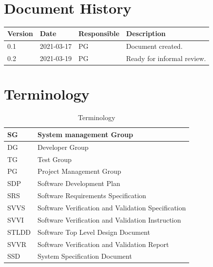 \documentclass{article}
\date {#1}
\title {
    \documentNumber {08}
    \documentVersion {0.2}
    \documentTitle {Project Final Report}
    \documentGroup {2}
    \documentResponsible {Project Management Group}
    \documentAuthors {Project Management Group}
    \documentDate {2021-03-19}
}
\begin{document}
\maketitle
\thispagestyle{empty}

\newpage

\tableofcontents

\newpage

\section{Document History}
\begin{tabular}{ l | l | l | l }
    Version & Date & Responsible & Description \\
    \hline
    0.1 & 2021-03-17 & PG & Document created. \\
    \hline
    0.2 & 2021-03-19 & PG & Ready for informal review. \\
\end{tabular}

\section{Terminology}
    \begin{table}[h]
        \centering
        \begin{tabular}{| l | l |}
            \hline
                SG & System management Group \\
            \hline
                DG & Developer Group \\
            \hline
                TG & Test Group \\
            \hline
                PG & Project Management Group \\
            \hline 
                SDP & Software Development Plan \\
            \hline
                SRS & Software Requirements Specification \\
            \hline
                SVVS & Software Verification and Validation Specification \\
            \hline
                SVVI & Software Verification and Validation Instruction \\
            \hline
                STLDD & Software Top Level Design Document \\
            \hline
                SVVR & Software Verification and Validation Report \\
            \hline
                SSD & System Specification Document \\
            \hline
        \end{tabular}
        \caption{Terminology}
        \label{Terminology}
    \end{table}
\end{document}
